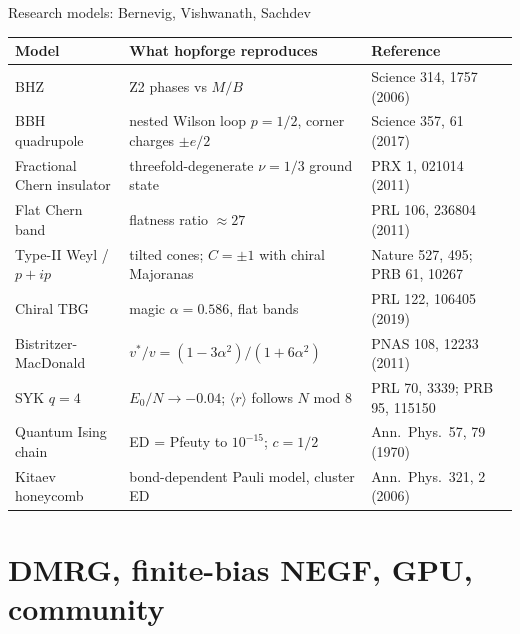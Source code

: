 \documentclass[aspectratio=169,11pt]{beamer}
\begin{document}
\begin{frame}{Research models: Bernevig, Vishwanath, Sachdev}
\scriptsize
\renewcommand{\arraystretch}{1.3}
\begin{tabularx}{\textwidth}{@{}l X l@{}}
\toprule
\textbf{Model} & \textbf{What hopforge reproduces} & \textbf{Reference}\\
\midrule
BHZ & Z2 phases vs $M/B$ & Science 314, 1757 (2006)\\
BBH quadrupole & nested Wilson loop $p=1/2$, corner charges $\pm e/2$ & Science 357, 61 (2017)\\
Fractional Chern insulator & threefold-degenerate $\nu=1/3$ ground state & PRX 1, 021014 (2011)\\
Flat Chern band & flatness ratio $\approx27$ & PRL 106, 236804 (2011)\\
Type-II Weyl / $p+ip$ & tilted cones; $C=\pm1$ with chiral Majoranas & Nature 527, 495; PRB 61, 10267\\
Chiral TBG & magic $\alpha=0.586$, flat bands & PRL 122, 106405 (2019)\\
Bistritzer-MacDonald & $v^*/v=(1-3\alpha^2)/(1+6\alpha^2)$ & PNAS 108, 12233 (2011)\\
SYK $q=4$ & $E_0/N\to-0.04$; $\langle r\rangle$ follows $N$ mod 8 & PRL 70, 3339; PRB 95, 115150\\
Quantum Ising chain & ED = Pfeuty to $10^{-15}$; $c=1/2$ & Ann.\ Phys.\ 57, 79 (1970)\\
Kitaev honeycomb & bond-dependent Pauli model, cluster ED & Ann.\ Phys.\ 321, 2 (2006)\\
\bottomrule
\end{tabularx}
\end{frame}

\section{DMRG, finite-bias NEGF, GPU, community}
\end{document}
